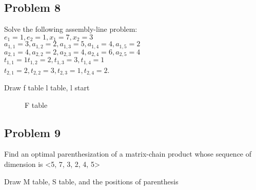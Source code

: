 \documentclass[a4paper]{article}
\makeatletter
\newenvironment{solution}
  {\begin{proof}[Solution]}
  {\end{proof}}
\renewenvironment{proof}[1][\proofname]{%
  \par\pushQED{\qed}\normalfont%
  \topsep6\p@\@plus6\p@\relax
  \trivlist\item[\hskip\labelsep\bfseries#1\@addpunct{.}]%
  \ignorespaces
}{%
  \popQED\endtrivlist\@endpefalse
}
\makeatother
\begin{document}
\subsection*{Problem 8}
Solve the following assembly-line problem: \\ $e_1=1, e_2=1, x_1=7,x_2=3$ \\ $a_{1,1}=3, a_{1,2}=2,a_{1,3}=5, a_{1,4}=4, a_{1,5}=2$ \\ $a_{2,1}=4, a_{2,2}=2, a_{2,3}=4, a_{2,4}=6, a_{2,5}=4$ \\ $t_{1,1}=1 t_{1,2}=2, t_{1,3}=3, t_{1,4}=1$ \\ $t_{2,1}=2, t_{2,2}=3, t_{2,3}=1, t_{2,4}=2$.
\begin{solution}
Draw f table
l table, l start \\
\begin{figure}[H]
\centering
{}
\caption{F table}
\end{figure}
\end{solution}

\subsection*{Problem 9}
Find an optimal parenthesization of a matrix-chain product whose sequence of dimension is <5, 7, 3, 2, 4, 5>
\begin{solution}
Draw M table, S table, and the positions of parenthesis
\end{solution}
\end{document}
